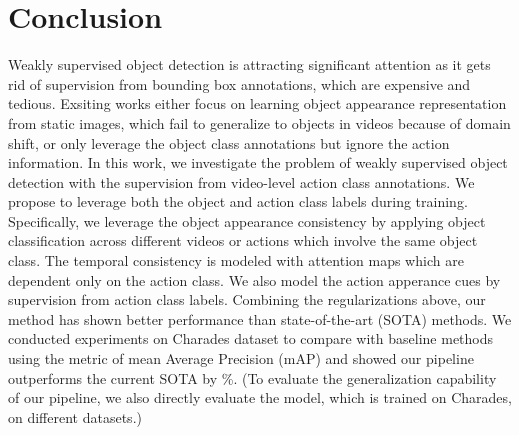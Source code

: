 \section{Conclusion}
Weakly supervised object detection is attracting significant attention as it gets rid of supervision from bounding box annotations, which are expensive and tedious. Exsiting works either focus on learning object appearance representation from static images, which fail to generalize to objects in videos because of domain shift, or only leverage the object class annotations but ignore the action information. In this work, we investigate the problem of weakly supervised object detection with the supervision from video-level action class annotations. We propose to leverage both the object and action class labels during training. Specifically, we leverage the object appearance consistency by applying object classification across different videos or actions which involve the same object class. The temporal consistency is modeled with attention maps which are dependent only on the action class. We also model the action apperance cues by supervision from action class labels. Combining the regularizations above, our method has shown better performance than state-of-the-art (SOTA) methods. We conducted experiments on Charades dataset to compare with baseline methods using the metric of mean Average Precision (mAP) and showed our pipeline outperforms the current SOTA by \%. (To evaluate the generalization capability of our pipeline, we also directly evaluate the model, which is trained on Charades, on different datasets.)